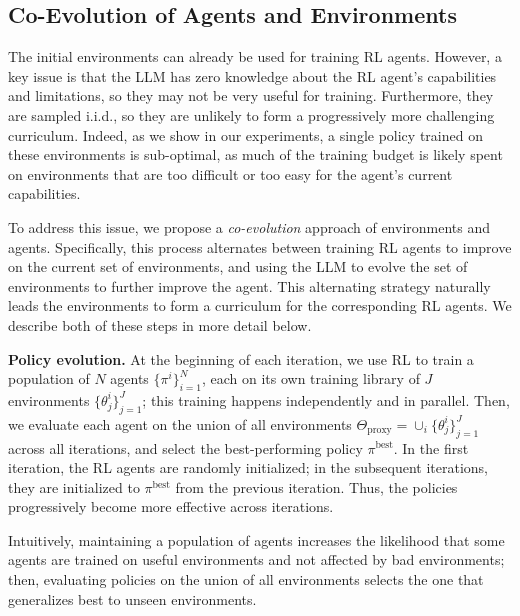 \documentclass{article}
\begin{document}
\subsection{Co-Evolution of Agents and Environments}
\label{sec:coevolution}
The initial environments can already be used for training RL agents. However, a key issue is that the LLM has zero knowledge about the RL agent's capabilities and limitations, so they may not be very useful for training. Furthermore, they are sampled i.i.d., so they are unlikely to form a progressively more challenging curriculum. Indeed, as we show in our experiments, a single policy trained on these environments is sub-optimal, as much of the training budget is likely spent on environments that are too difficult or too easy for the agent's current capabilities.

To address this issue, we propose a \textit{co-evolution} approach of environments and agents. Specifically, this process alternates between training RL agents to improve on the current set of environments, and using the LLM to evolve the set of environments to further improve the agent. This alternating strategy naturally leads the environments to form a curriculum for the corresponding RL agents. We describe both of these steps in more detail below.

\textbf{Policy evolution.}
At the beginning of each iteration, we use RL to train a population of $N$ agents $\{\pi^i\}_{i=1}^N$, each on its own training library of $J$ environments $\{\theta^i_j\}_{j=1}^J$; this training happens independently and in parallel. Then, we evaluate each agent on the union of all environments $\Theta_{\text{proxy}} = \cup_i \{\theta^i_j\}_{j=1}^J$ across all iterations, and select the best-performing policy $\pi^{\text{best}}$. In the first iteration, the RL agents are randomly initialized; in the subsequent iterations, they are initialized to $\pi^{\text{best}}$ from the previous iteration. Thus, the policies progressively become more effective across iterations.

Intuitively, maintaining a population of agents increases the likelihood that some agents are trained on useful environments and not affected by bad environments; then, evaluating policies on the union of all environments selects the one that generalizes best to unseen environments.
\end{document}
